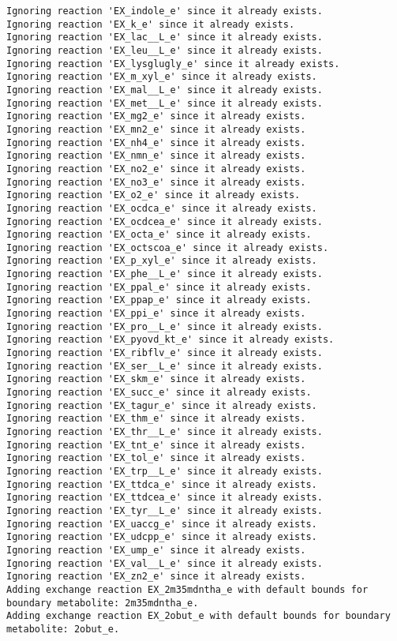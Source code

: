 \documentclass[
  letterpaper,
  DIV=11,
  numbers=noendperiod]{scrartcl}
\begin{document}
\begin{verbatim}
Ignoring reaction 'EX_indole_e' since it already exists.
Ignoring reaction 'EX_k_e' since it already exists.
Ignoring reaction 'EX_lac__L_e' since it already exists.
Ignoring reaction 'EX_leu__L_e' since it already exists.
Ignoring reaction 'EX_lysglugly_e' since it already exists.
Ignoring reaction 'EX_m_xyl_e' since it already exists.
Ignoring reaction 'EX_mal__L_e' since it already exists.
Ignoring reaction 'EX_met__L_e' since it already exists.
Ignoring reaction 'EX_mg2_e' since it already exists.
Ignoring reaction 'EX_mn2_e' since it already exists.
Ignoring reaction 'EX_nh4_e' since it already exists.
Ignoring reaction 'EX_nmn_e' since it already exists.
Ignoring reaction 'EX_no2_e' since it already exists.
Ignoring reaction 'EX_no3_e' since it already exists.
Ignoring reaction 'EX_o2_e' since it already exists.
Ignoring reaction 'EX_ocdca_e' since it already exists.
Ignoring reaction 'EX_ocdcea_e' since it already exists.
Ignoring reaction 'EX_octa_e' since it already exists.
Ignoring reaction 'EX_octscoa_e' since it already exists.
Ignoring reaction 'EX_p_xyl_e' since it already exists.
Ignoring reaction 'EX_phe__L_e' since it already exists.
Ignoring reaction 'EX_ppal_e' since it already exists.
Ignoring reaction 'EX_ppap_e' since it already exists.
Ignoring reaction 'EX_ppi_e' since it already exists.
Ignoring reaction 'EX_pro__L_e' since it already exists.
Ignoring reaction 'EX_pyovd_kt_e' since it already exists.
Ignoring reaction 'EX_ribflv_e' since it already exists.
Ignoring reaction 'EX_ser__L_e' since it already exists.
Ignoring reaction 'EX_skm_e' since it already exists.
Ignoring reaction 'EX_succ_e' since it already exists.
Ignoring reaction 'EX_tagur_e' since it already exists.
Ignoring reaction 'EX_thm_e' since it already exists.
Ignoring reaction 'EX_thr__L_e' since it already exists.
Ignoring reaction 'EX_tnt_e' since it already exists.
Ignoring reaction 'EX_tol_e' since it already exists.
Ignoring reaction 'EX_trp__L_e' since it already exists.
Ignoring reaction 'EX_ttdca_e' since it already exists.
Ignoring reaction 'EX_ttdcea_e' since it already exists.
Ignoring reaction 'EX_tyr__L_e' since it already exists.
Ignoring reaction 'EX_uaccg_e' since it already exists.
Ignoring reaction 'EX_udcpp_e' since it already exists.
Ignoring reaction 'EX_ump_e' since it already exists.
Ignoring reaction 'EX_val__L_e' since it already exists.
Ignoring reaction 'EX_zn2_e' since it already exists.
Adding exchange reaction EX_2m35mdntha_e with default bounds for boundary metabolite: 2m35mdntha_e.
Adding exchange reaction EX_2obut_e with default bounds for boundary metabolite: 2obut_e.

\end{verbatim}
\end{document}

